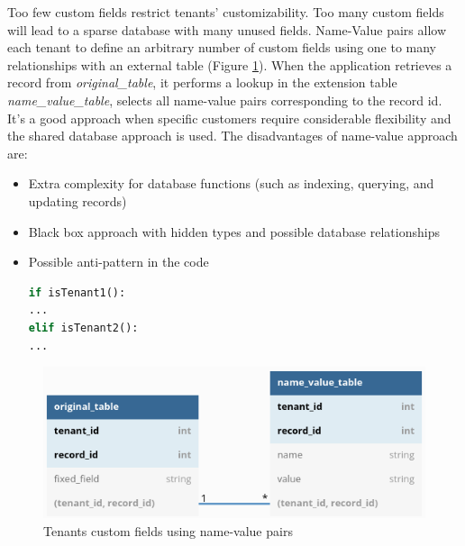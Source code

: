 \documentclass[11pt,english]{article} %
\begin{document}
Too few custom fields restrict tenants' customizability.
Too many custom fields will lead to a sparse database with many unused fields.
Name‐Value pairs allow each tenant to define an arbitrary number of custom fields \cite{multi-tenant-data-architecture} using one to many relationships with an external table (Figure \ref{fig:name-value-pairs-database}).
When the application retrieves a record from \textit{original\_table}, it performs a lookup in the extension table \textit{name\_value\_table}, selects all name-value pairs corresponding to the record id.
It's a good approach when specific customers require considerable flexibility and the shared database approach is used. 
The disadvantages of name-value approach are:
\begin{itemize}
    \item Extra complexity for database functions (such as indexing, querying, and updating records) 
    \item Black box approach with hidden types and possible database relationships
    \item Possible anti-pattern in the code
\begin{lstlisting}[language=python,numbers=none]
if isTenant1():
...
elif isTenant2():
...
\end{lstlisting}
\end{itemize}

\begin{figure}[H]
    \centering
    \includegraphics[scale=0.5]{img/name-value-pairs.png}
    \caption{Tenants custom fields using name-value pairs}
    \label{fig:name-value-pairs-database}
\end{figure}

\end{document}

